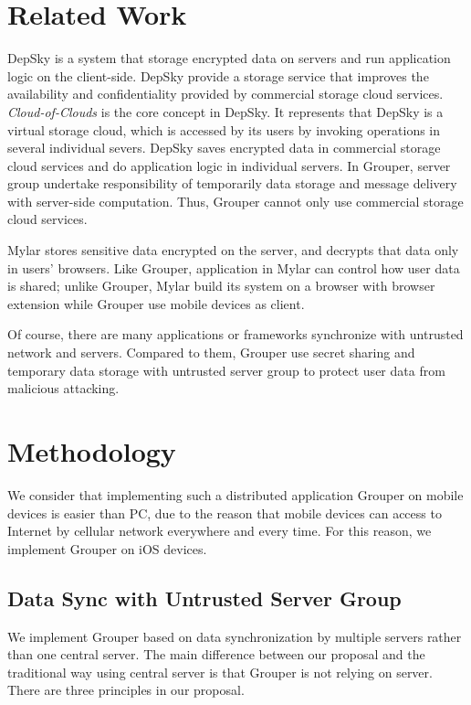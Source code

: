 \documentclass[twocolumn,10pt]{article}
\begin{document}
\section{Related Work}

DepSky\cite{bessani2013depsky} is a system that storage encrypted data on servers and run application logic on the client-side\cite{wang2016sieve}. DepSky provide a storage service that improves the availability and confidentiality provided by commercial storage cloud services. \emph{Cloud-of-Clouds} is the core concept in DepSky. It represents that DepSky is a virtual storage cloud, which is accessed by its users by invoking operations in several individual severs. DepSky saves encrypted data in commercial storage cloud services and do application logic in individual servers. In Grouper,  server group undertake responsibility of temporarily data storage and message delivery with server-side computation. Thus, Grouper cannot only use commercial storage cloud services.

Mylar\cite{popa2014building} stores sensitive data encrypted on the server, and decrypts that data only in users’ browsers. Like Grouper, application in Mylar can control how user data is shared\cite{wang2016sieve}; unlike Grouper, Mylar build its system on a browser with browser extension while Grouper use mobile devices as client.

Of course, there are many applications or frameworks synchronize with untrusted network and servers. Compared to them, Grouper use secret sharing and temporary data storage with untrusted server group to protect user data from malicious attacking.
\section{Methodology}

We consider that implementing such a distributed application Grouper on mobile devices is easier than PC, due to the reason that mobile devices can access to Internet by cellular network everywhere and every time. For this reason, we implement Grouper on iOS devices. 

\subsection{Data Sync with Untrusted Server Group}

We implement Grouper based on data synchronization by multiple servers rather than one central server. The main difference between our proposal and the traditional way using central server is that Grouper is not relying on server. There are three principles in our proposal. 
\end{document}
